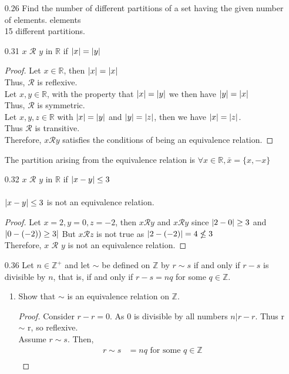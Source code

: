 \documentclass[12pt]{article}
\newcommand{\Z}{\mathds{Z}}
\newcommand{\R}{\mathbb{R}}
\DeclarePairedDelimiter\abs{\lvert}{\rvert}
\begin{document}
\begin{enumerate}
	\item[0.26] Find the number of different partitions of a set having the given number of elements. elements \\
		15 different partitions.
	\item[0.31] $x$ $\mathscr{R} $ $y$ in $\R$ if $\abs{x} = \abs{y}$
		\begin{proof}
			Let $x \in \R$, then $\abs{x} = \abs{x}$ \\
			Thus, $\mathscr{R}$ is reflexive.\\
			Let $x,y \in \R$, with the property that $\abs{x}=\abs{y}$ we then have $\abs{y}=\abs{x}$ \\
			Thus, $\mathscr{R}$ is symmetric.\\
			Let $x,y,z \in \R$ with  $\abs{x}=\abs{y}$ and $\abs{y}=\abs{z}$, then we have $\abs{x}=\abs{z}$. \\
			Thus $\mathscr{R}$ is transitive.\\
			Therefore, $x\mathscr{R} y$ satisfies the conditions of being an equivalence relation.		
		\end{proof}
		The partition arising from the equivalence relation is $\forall x \in \R, \bar{x} = \{x,-x\}$
	\item[0.32]  $x$ $\mathscr{R} $ $y$ in $\R$ if $\abs{x-y} \leq 3$ \\ \\
		$\abs{x-y} \leq 3$ is not an equivalence relation. 
		\begin{proof}
			Let $x=2,y=0,z=-2$, then $x\mathscr{R} y$ and $x\mathscr{R} y$ since $\abs{2-0}\geq 3$ and $\abs{0-(-2))\geq 3}$ But $x\mathscr{R}z$ is not true as $\abs{2-(-2)}=4\nleq3$\\
			Therefore, $x$ $\mathscr{R} $ $y$ is not an equivalence relation.
		\end{proof}
	\item[0.36] Let $n \in \Z^+$ and let $\sim$ be defined on $\Z$ by $r \sim s$ if and only if $r-s$ is divisible by $n$, that is, if and only if $r-s=nq$ for some $q \in \Z$.
	\begin{enumerate}
		\item Show that $\sim$ is an equivalence relation on $\Z$.
		\begin{proof}
			Consider $r-r=0$. As 0 is divisible by all numbers $ n | r-r.$ Thus r $\sim$ r, so reflexive.\\
			Assume $r \sim s$. Then, 
			$$
			\begin{aligned}
				r \sim s &= nq \text{ for some } q \in \Z\\

\end{aligned}$$
\end{proof}
\end{enumerate}
\end{enumerate}
\end{document}
